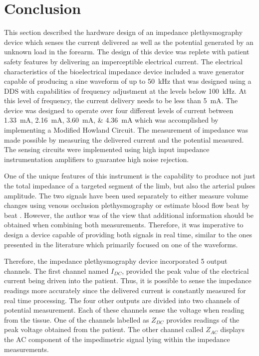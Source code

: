 \section{Conclusion}
\label{conclusion impedance device}
This section described the hardware design of an impedance plethysmography device which senses the current delivered as well as the potential generated by an unknown load in the forearm. The design of this device was replete with patient safety features by delivering an imperceptible electrical current. The electrical characteristics of the bioelectrical impedance device included a wave generator capable of producing a sine waveform of up to \SI{50}{\kHz} that was designed using a DDS with capabilities of frequency adjustment at the levels below \SI{100}{\kHz}. At this level of frequency, the current delivery needs to be less than \SI{5}{\mA}. The device was designed to operate over four different levels of current between \SIlist{1.33;2.16;3.60;4.36}{\mA} which was accomplished by implementing a Modified Howland Circuit. The measurement of impedance was made possible by measuring the delivered current and the potential measured. The sensing circuits were implemented using high input impedance instrumentation amplifiers to guarantee high noise rejection. 

One of the unique features of this instrument is the capability to produce not just the total impedance of a targeted segment of the limb, but also the arterial pulses amplitude. The two signals have been used separately to either measure volume changes using venous occlusion plethysmography \cite{mohapatra1979measurement, costeloe1980continuous, yamakoshi1980limb} or estimate blood flow beat by beat  \cite{porter1985measurement, corciova2011peripheral, brown1975impedance, marks1985computer}. However, the author was of the view that additional information should be obtained when combining both measurements. Therefore, it was imperative to design a device capable of providing both signals in real time, similar to the ones presented in the literature which primarily focused on one of the waveforms. 

Therefore, the impedance plethysmography device incorporated 5 output channels. The first channel named $I_{DC}$, provided the peak value of the electrical current being driven into the patient. Thus, it is possible to sense the impedance readings more accurately since the delivered current is constantly measured for real time processing. The four other outputs are divided into two channels of potential measurement. Each of these channels sense the voltage when reading from the tissue. One of the channels labelled as $Z_{DC}$ provides readings of the peak voltage obtained from the patient. The other channel called $Z_{AC}$ displays the AC component of the impedimetric signal lying within the impedance measurements.  

